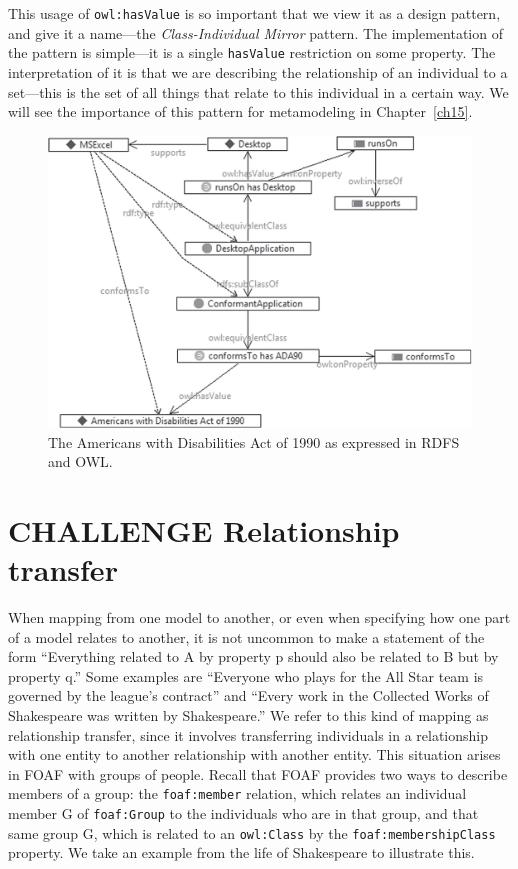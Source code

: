 This usage of \texttt{owl:hasValue} is so important that we view it as a design
pattern, and give it a name---the \emph{Class-Individual Mirror} pattern. The
implementation of the pattern is simple---it is a single \texttt{hasValue}
restriction on some property. The interpretation of it is that we are
describing the relationship of an individual to a set---this is the set
of all things that relate to this individual in a certain way. We will
see the importance of this pattern for metamodeling in Chapter~\ref{ch15}.

\begin{figure}
\centering
\includegraphics[width=5in]{SWWOv3/media/ch12/f12-10.eps}
\caption{The Americans with Disabilities Act of 1990 as expressed in RDFS and OWL.}
\label{fig:ch12.10}
\end{figure}



\section{CHALLENGE Relationship transfer}

When mapping from one model to another, or even when specifying how one
part of a model relates to another, it is not uncommon to make a
statement of the form ``Everything related to A by property p should
also be related to B but by property q.'' Some examples are ``Everyone
who plays for the All Star team is governed by the league's contract''
and ``Every work in the Collected Works of Shakespeare was written by
Shakespeare.'' We refer to this kind of mapping as relationship
transfer, since it involves transferring individuals in a relationship
with one entity to another relationship with another entity. This
situation arises in FOAF with groups of people. Recall that FOAF
provides two ways to describe members of a group: the \texttt{foaf:member}
relation, which relates an individual member G of \texttt{foaf:Group} to the
individuals who are in that group, and that same group G, which is
related to an \texttt{owl:Class} by the \texttt{foaf:membershipClass} property. We take an
example from the life of Shakespeare to illustrate this.

